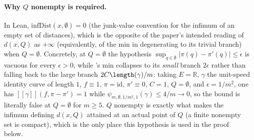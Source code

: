 \begin{lemma}
  \paragraph{Why $Q$ nonempty is required.} In Lean, $\mathrm{infDist}(x,\emptyset)=0$ (the
  junk-value convention for the infimum of an empty set of distances), which is the opposite of
  the paper's intended reading of $d(x,Q)$ as $+\infty$ (equivalently, of the min in
   degenerating to its trivial branch) when $Q=\emptyset$. Concretely, at $Q=\emptyset$
  the hypothesis $\sup_{q\in\emptyset}|\pi(q)-\pi'(q)|\le\epsilon$ is vacuous for every $\epsilon>0$,
  while 's min collapses to its \emph{small} branch $2\epsilon$ rather than falling
  back to the large branch $2C\length(\gamma)/m$: taking $E=\mathbb{R}$, $\gamma$ the unit-speed
  identity curve of length $1$, $f\equiv 1$, $\pi=\mathrm{id}$, $\pi'\equiv 0$, $C=1$, $Q=\emptyset$,
  and $\epsilon=1/m^2$, one has $[[\gamma]](f,\pi-\pi')=1$ while
  $\psi_{m,\emptyset,1/m^2,1}(\gamma) \le 4/m \to 0$, so the bound is literally false at $Q=\emptyset$
  for $m \ge 5$. $Q$ nonempty is exactly what makes the infimum defining $d(x,Q)$ attained at an
  actual point of $Q$ (a finite nonempty set is compact), which is the only place this hypothesis
  is used in the proof below.
\end{lemma}
